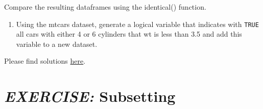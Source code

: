 \documentclass[
  12pt,
  oneside]{book}
\providecommand{\tightlist}{%
  \setlength{\itemsep}{0pt}\setlength{\parskip}{0pt}}
\begin{document}
Compare the resulting dataframes using the identical() function.

\begin{enumerate}
\def\labelenumi{\alph{enumi})}
\setcounter{enumi}{1}
\tightlist
\item
  Using the mtcars dataset, generate a logical variable that indicates with \texttt{TRUE} all cars with either 4 or 6 cylinders that wt is less than 3.5 and add this variable to a new dataset.
\end{enumerate}

Please find solutions \href{https://raw.githubusercontent.com/hubchev/courses/main/scr/exe_base_pipe.R}{here}.

\hypertarget{exercise-subsetting}{%
\section*{\texorpdfstring{\emph{EXERCISE:} Subsetting}{EXERCISE: Subsetting}}\label{exercise-subsetting}}
\end{document}
